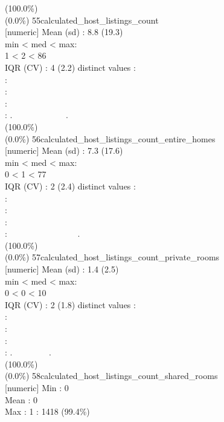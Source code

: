 \documentclass[
  journal,
]{IEEEtran}%
\begin{document}
(100.0\%) \\
(0.0\%) \textbar{} \textbar{}
55\textbar calculated\_host\_listings\_count\\
{[}numeric{]} \textbar Mean (sd) : 8.8 (19.3)\\
min \textless{} med \textless{} max:\\
1 \textless{} 2 \textless{} 86\\
IQR (CV) : 4 (2.2)  distinct values \textbar{} \textbar:\\
:\\
:\\
:\\
: . ~~~~~~~~~~~~. \\
(100.0\%) \\
(0.0\%) \textbar{} \textbar{}
56\textbar calculated\_host\_listings\_count\_entire\_homes\\
{[}numeric{]} \textbar Mean (sd) : 7.3 (17.6)\\
min \textless{} med \textless{} max:\\
0 \textless{} 1 \textless{} 77\\
IQR (CV) : 2 (2.4)  distinct values \textbar{} \textbar:\\
:\\
:\\
:\\
: ~~~~~~~~~~~~~~~~. \\
(100.0\%) \\
(0.0\%) \textbar{} \textbar{}
57\textbar calculated\_host\_listings\_count\_private\_rooms\\
{[}numeric{]} \textbar Mean (sd) : 1.4 (2.5)\\
min \textless{} med \textless{} max:\\
0 \textless{} 0 \textless{} 10\\
IQR (CV) : 2 (1.8)  distinct values \textbar{} \textbar:\\
:\\
:\\
:\\
: . ~~~~~~~~. \\
(100.0\%) \\
(0.0\%) \textbar{} \textbar{}
58\textbar calculated\_host\_listings\_count\_shared\_rooms\\
{[}numeric{]} \textbar Min : 0\\
Mean : 0\\
Max : 1  : 1418 (99.4\%)\\
\end{document}
